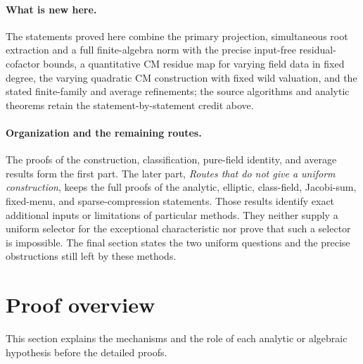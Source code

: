 \documentclass[11pt]{article}
\theoremstyle{definition}
\theoremstyle{remark}
\begin{document}
\paragraph{What is new here.}
The statements proved here combine the primary projection, simultaneous
root extraction and a full finite-algebra norm with the precise
input-free residual-cofactor bounds, a quantitative CM residue map
for varying field data in fixed degree, the varying quadratic CM
construction with fixed wild valuation, and the
stated finite-family and average refinements; the source algorithms
and analytic theorems retain the statement-by-statement credit above.

\paragraph{Organization and the remaining routes.}
The proofs of the construction, classification, pure-field identity,
and average results form the first part. The later part,
\emph{Routes that do not give a uniform construction}, keeps the full
proofs of the analytic, elliptic, class-field, Jacobi-sum, fixed-menu,
and sparse-compression statements. Those results identify exact
additional inputs or limitations of particular methods. They neither
supply a uniform selector for the exceptional characteristic nor prove
that such a selector is impossible. The final section states the two
uniform questions and the precise obstructions still left by these
methods.

\section{Proof overview}
\label{sec:proof-overview}
This section explains the mechanisms and the role of each analytic or
algebraic hypothesis before the detailed proofs.
\end{document}
